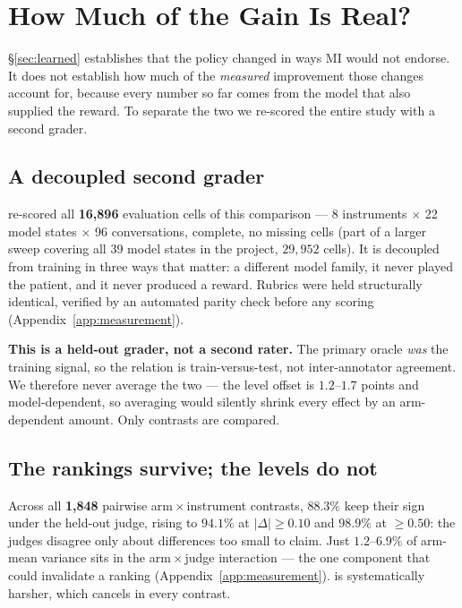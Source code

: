 \section{How Much of the Gain Is Real?}
\label{sec:heldout}

\S\ref{sec:learned} establishes that the policy changed in ways MI would not endorse. It does
not establish how much of the \emph{measured} improvement those changes account for, because
every number so far comes from the model that also supplied the reward. To separate the two we
re-scored the entire study with a second grader.

\subsection{A decoupled second grader}
\heldoutjudge{} re-scored all \textbf{16{,}896} evaluation cells of this comparison --- 8
instruments $\times$ 22 model states $\times$ 96 conversations, complete, no missing cells (part
of a larger sweep covering all 39 model states in the project, $29{,}952$ cells). It is decoupled from
training in three ways that matter: a different model family, it never played the patient, and
it never produced a reward. Rubrics were held structurally identical, verified by an automated
parity check before any scoring (Appendix~\ref{app:measurement}).

\textbf{This is a held-out grader, not a second rater.} The primary oracle \emph{was} the
training signal, so the relation is train-versus-test, not inter-annotator agreement. We
therefore never average the two --- the level offset is $1.2$--$1.7$ points and
model-dependent, so averaging would silently shrink every effect by an arm-dependent amount.
Only contrasts are compared.

\subsection{The rankings survive; the levels do not}
Across all \textbf{1{,}848} pairwise arm\,$\times$\,instrument contrasts, $88.3\%$ keep their
sign under the held-out judge, rising to $94.1\%$ at $|\Delta|\geq0.10$ and $98.9\%$ at
$\geq0.50$: the judges disagree only about differences too small to claim. Just $1.2$--$6.9\%$
of arm-mean variance sits in the arm\,$\times$\,judge interaction --- the one component that
could invalidate a ranking (Appendix~\ref{app:measurement}). \heldoutjudge{} is systematically
harsher, which cancels in every contrast.

